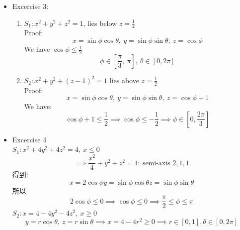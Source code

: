 \documentclass[../main.tex]{subfiles}
\begin{document}
\begin{itemize}
\begin{enumerate}
\begin{equation}
\right]
\end{equation}
\end{enumerate}
\item Excercise 3:
\begin{enumerate}
\item $S_1: x^2 + y^2 + z^2 =1$, lies below $z=\frac{1}{2}$\\
Proof:
\begin{equation}
x = \sin\phi\cos\theta,~
y = \sin\phi\sin\theta,~
z = \cos\phi
\end{equation}
We have $\cos\phi \leq \frac{1}{2} $
\begin{equation}
\phi \in \left[
\frac{\pi}{3},~\pi
\right],~\theta\in[0,2\pi]
\end{equation}
\item $S_2: x^2+y^2+(z-1)^2 = 1$ lies above $z=\frac{1}{2}$\\
Proof:
\begin{equation}
x = \sin\phi\cos\theta,~y = \sin\phi\sin\theta,~ z= \cos\phi+1
\end{equation}
We have:
\begin{equation}
\cos\phi +1 \leq \frac{1}{2} \implies \cos\phi \leq -\frac{1}{2} 
\implies \phi \in\left[
0, \frac{2\pi}{3}
\right] 
\end{equation}
\end{enumerate}
\item Excercise 4\\
$S_1: x^2+4y^2+4z^2 = 4,~x\leq 0$
\begin{equation}
 \implies \frac{x^2}{4}+y^2+z^2 = 1:~\text{semi-axis } 2,1,1
\end{equation}
得到:
\begin{equation}
x = 2\cos\phi
y = \sin\phi\cos\theta
z = \sin\phi\sin\theta
\end{equation}
所以
\begin{equation}
2\cos\phi \leq 0 \implies \cos\phi \leq 0 \implies \frac{\pi}{2}\leq \phi \leq \pi
\end{equation}
$S_2: x = 4-4y^2-4z^2,~x\geq 0$
\begin{equation}
y = r\cos\theta,~z=r\sin\theta \implies x=4-4r^2 \geq 0 \implies r\in[0,1], \theta \in [0,2\pi]
\end{equation}
\end{itemize}
\end{document}
